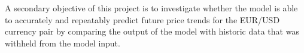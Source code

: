 \documentclass[11pt]{informatics-report}
\begin{document}
A secondary objective of this project is to investigate whether the model is able to accurately and repeatably predict future price trends for the EUR/USD currency pair by comparing the output of the model with historic data that was withheld from the model input.





%

%
%
%
%





\appendix
%
%
%
\end{document}
